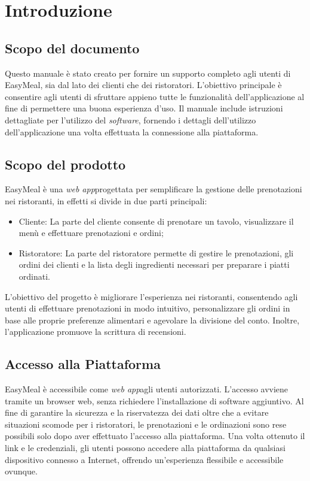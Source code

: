 \section{Introduzione}
\subsection{Scopo del documento}
Questo manuale è stato creato per fornire un supporto completo agli utenti di 
EasyMeal, sia dal lato dei clienti che dei ristoratori. 
L'obiettivo principale è consentire agli utenti di sfruttare appieno tutte le
funzionalità dell'applicazione al fine di permettere una buona esperienza d'uso. 
Il manuale include istruzioni dettagliate per l'utilizzo del \textit{software}, 
fornendo i dettagli dell'utilizzo dell'applicazione una volta effettuata la
connessione alla piattaforma.



\subsection{Scopo del prodotto}
EasyMeal è una \textit{web app}\g progettata per semplificare la gestione delle 
prenotazioni nei ristoranti, in effetti si divide in due parti principali:
\begin{itemize}
	\item Cliente\g: La parte del cliente consente di prenotare un tavolo, 
		visualizzare il menù e effettuare prenotazioni e ordini\g ;

	\item Ristoratore\g : La parte del ristoratore permette di gestire le 
		prenotazioni, gli ordini dei clienti e la lista degli ingredienti 
		necessari per preparare i piatti ordinati.
\end{itemize}

L'obiettivo del progetto è migliorare l'esperienza nei ristoranti, consentendo 
agli utenti di effettuare prenotazioni in modo intuitivo, personalizzare gli 
ordini in base alle proprie preferenze alimentari e agevolare la divisione del 
conto. Inoltre, l'applicazione promuove la scrittura di recensioni.

\subsection{Accesso alla Piattaforma}
EasyMeal è accessibile come \textit{web app}\g agli utenti autorizzati. 
L'accesso avviene tramite un browser web, senza richiedere l'installazione di 
software aggiuntivo.
Al fine di garantire la sicurezza e la riservatezza dei dati oltre che a evitare
situazioni scomode per i ristoratori, le prenotazioni e le ordinazioni sono rese
possibili solo dopo aver effettuato l'accesso alla piattaforma.
Una volta ottenuto il link e le credenziali, gli utenti possono accedere alla 
piattaforma da qualsiasi dispositivo connesso a Internet, offrendo un'esperienza 
flessibile e accessibile ovunque.

